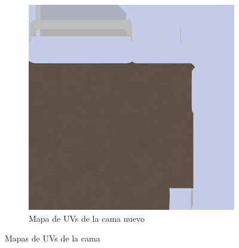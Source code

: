 \documentclass[12pt, a4paper,twoside,titlepage]{book}
\begin{document}
\begin{figure}
\begin{subfigure}{.5\textwidth}
		\includegraphics[width=.95\linewidth]{TGF/Artes/TexBed2.png}
		\caption{Mapa de UVs de la cama nuevo}
	\end{subfigure}
	\caption{Mapas de UVs de la cama}
	\label{fig:texBed}
\end{figure}
\end{document}
